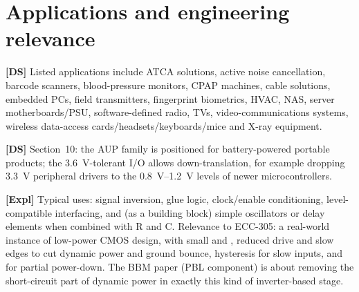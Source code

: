 \documentclass[11pt,a4paper]{article}
\newcommand{\DS}{\textbf{[DS]}}
\newcommand{\Expl}{\textbf{[Expl]}}
\begin{document}
\section{Applications and engineering relevance}
\DS{} Listed applications include ATCA solutions, active noise cancellation, barcode scanners, blood-pressure monitors, CPAP machines, cable solutions, embedded PCs, field transmitters, fingerprint biometrics, HVAC, NAS, server motherboards/PSU, software-defined radio, TVs, video-communications systems, wireless data-access cards/headsets/keyboards/mice and X-ray equipment.

\DS{} Section~10: the AUP family is positioned for battery-powered portable products; the \SI{3.6}{\volt}-tolerant I/O allows down-translation, for example dropping \SI{3.3}{\volt} peripheral drivers to the \SIrange{0.8}{1.2}{\volt} levels of newer microcontrollers.

\Expl{} Typical uses: signal inversion, glue logic, clock/enable conditioning, level-compatible interfacing, and (as a building block) simple oscillators or delay elements when combined with R and C. Relevance to ECC-305: a real-world instance of low-power CMOS design, with small \Cpd{} and \Icc, reduced drive and slow edges to cut dynamic power and ground bounce, hysteresis for slow inputs, and \Ioff{} for partial power-down. The BBM paper (PBL component) is about removing the short-circuit part of dynamic power in exactly this kind of inverter-based stage.

\end{document}
